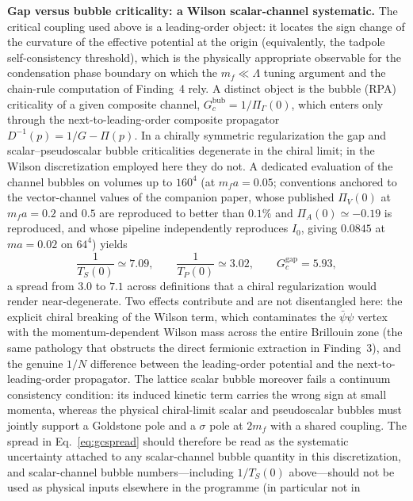 \documentclass[11pt,a4paper]{article}
\begin{document}
\textbf{Gap versus bubble criticality: a Wilson scalar-channel
systematic.}
The critical coupling used above is a leading-order object: it
locates the sign change of the curvature of the effective
potential at the origin (equivalently, the tadpole
self-consistency threshold), which is the physically appropriate
observable for the condensation phase boundary on which the
$m_f \ll \Lambda$ tuning argument and the chain-rule computation
of Finding~4 rely.
A distinct object is the bubble (RPA) criticality of a given
composite channel, $G_c^{\mathrm{bub}} = 1/\Pi_\Gamma(0)$, which
enters only through the next-to-leading-order composite
propagator $D^{-1}(p) = 1/G - \Pi(p)$.
In a chirally symmetric regularization the gap and
scalar--pseudoscalar bubble criticalities degenerate in the
chiral limit; in the Wilson discretization employed here they do
not.
A dedicated evaluation of the channel bubbles on volumes up to
$160^4$ (at $m_f a = 0.05$; conventions anchored to the
vector-channel values of the companion paper, whose published
$\Pi_V(0)$ at $m_f a = 0.2$ and $0.5$ are reproduced to better
than $0.1\%$ and $\Pi_A(0) \simeq -0.19$ is reproduced, and whose
pipeline independently reproduces $I_0$, giving $0.0845$ at
$m a = 0.02$ on $64^4$) yields
\begin{equation}
\frac{1}{T_S(0)} \simeq 7.09, \qquad
\frac{1}{T_P(0)} \simeq 3.02, \qquad
G_c^{\mathrm{gap}} = 5.93,
\label{eq:gcspread}
\end{equation}
a spread from $3.0$ to $7.1$ across definitions that a chiral
regularization would render near-degenerate.
Two effects contribute and are not disentangled here: the
explicit chiral breaking of the Wilson term, which contaminates
the $\bar\psi\psi$ vertex with the momentum-dependent Wilson mass
across the entire Brillouin zone (the same pathology that
obstructs the direct fermionic extraction in Finding~3), and the
genuine $1/N$ difference between the leading-order potential and
the next-to-leading-order propagator.
The lattice scalar bubble moreover fails a continuum consistency
condition: its induced kinetic term carries the wrong sign at
small momenta, whereas the physical chiral-limit scalar and
pseudoscalar bubbles must jointly support a Goldstone pole and a
$\sigma$ pole at $2m_f$ with a shared coupling.
The spread in Eq.~\eqref{eq:gcspread} should therefore be read as
the systematic uncertainty attached to any scalar-channel bubble
quantity in this discretization, and scalar-channel bubble
numbers---including $1/T_S(0)$ above---should not be used as
physical inputs elsewhere in the programme (in particular not in
\end{document}
